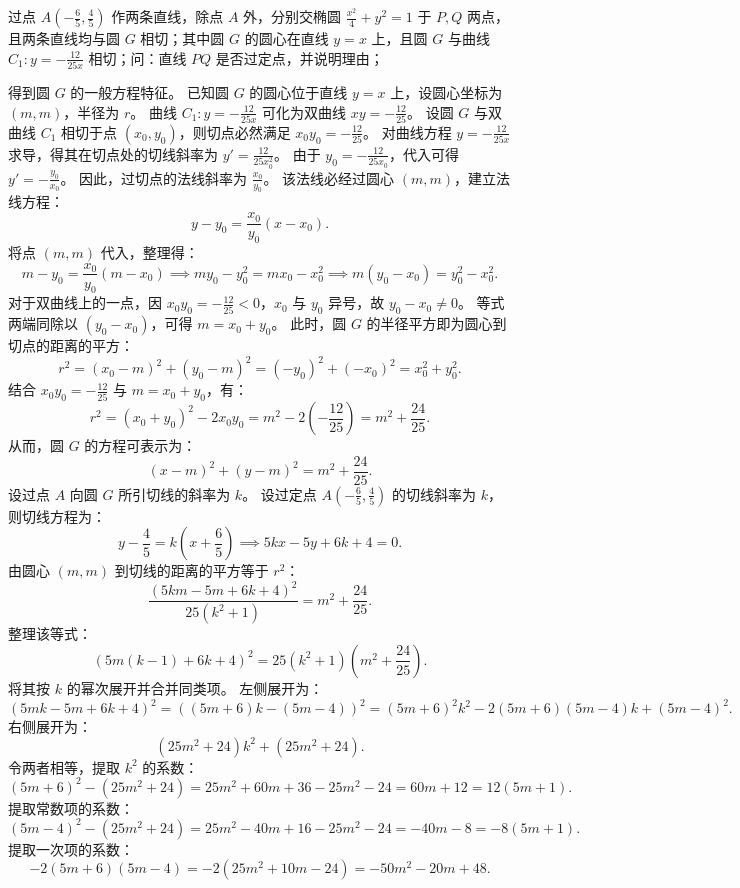 \begin{example}
过点 \(A\left(-\frac{6}{5},\frac{4}{5}\right)\) 作两条直线，除点 \(A\) 外，分别交椭圆 \(\frac{x^2}{4} + y^2 = 1\) 于 \(P,Q\) 两点，且两条直线均与圆 \(G\) 相切；其中圆 \(G\) 的圆心在直线 \(y = x\) 上，且圆 \(G\) 与曲线 \(C_1: y = -\frac{12}{25x}\) 相切；问：直线 \(PQ\) 是否过定点，并说明理由；
\end{example}
\begin{solution}
得到圆 $G$ 的一般方程特征。
已知圆 $G$ 的圆心位于直线 $y = x$ 上，设圆心坐标为 $(m, m)$，半径为 $r$。
曲线 $C_1: y = -\frac{12}{25x}$ 可化为双曲线 $xy = -\frac{12}{25}$。
设圆 $G$ 与双曲线 $C_1$ 相切于点 $(x_0, y_0)$，则切点必然满足 $x_0 y_0 = -\frac{12}{25}$。
对曲线方程 $y = -\frac{12}{25x}$ 求导，得其在切点处的切线斜率为 $y' = \frac{12}{25x_0^2}$。
由于 $y_0 = -\frac{12}{25x_0}$，代入可得 $y' = -\frac{y_0}{x_0}$。
因此，过切点的法线斜率为 $\frac{x_0}{y_0}$。
该法线必经过圆心 $(m, m)$，建立法线方程：
\[
y - y_0 = \frac{x_0}{y_0}(x - x_0).
\]
将点 $(m, m)$ 代入，整理得：
\[
m - y_0 = \frac{x_0}{y_0}(m - x_0) \implies my_0 - y_0^2 = mx_0 - x_0^2 \implies m(y_0 - x_0) = y_0^2 - x_0^2.
\]
对于双曲线上的一点，因 $x_0 y_0 = -\frac{12}{25} < 0$，$x_0$ 与 $y_0$ 异号，故 $y_0 - x_0 \neq 0$。
等式两端同除以 $(y_0 - x_0)$，可得 $m = x_0 + y_0$。
此时，圆 $G$ 的半径平方即为圆心到切点的距离的平方：
\[
r^2 = (x_0 - m)^2 + (y_0 - m)^2 = (-y_0)^2 + (-x_0)^2 = x_0^2 + y_0^2.
\]
结合 $x_0 y_0 = -\frac{12}{25}$ 与 $m = x_0 + y_0$，有：
\[
r^2 = (x_0 + y_0)^2 - 2x_0 y_0 = m^2 - 2\left(-\frac{12}{25}\right) = m^2 + \frac{24}{25}.
\]
从而，圆 $G$ 的方程可表示为：
\[
(x - m)^2 + (y - m)^2 = m^2 + \frac{24}{25}.
\]
设过点 $A$ 向圆 $G$ 所引切线的斜率为 $k$。
设过定点 $A\left(-\frac{6}{5}, \frac{4}{5}\right)$ 的切线斜率为 $k$，则切线方程为：
\[
y - \frac{4}{5} = k\left(x + \frac{6}{5}\right) \implies 5kx - 5y + 6k + 4 = 0.
\]
由圆心 $(m, m)$ 到切线的距离的平方等于 $r^2$：
\[
\frac{\left(5km - 5m + 6k + 4\right)^2}{25(k^2 + 1)} = m^2 + \frac{24}{25}.
\]
整理该等式：
\[
\left( 5m(k - 1) + 6k + 4 \right)^2 = 25(k^2 + 1)\left(m^2 + \frac{24}{25}\right).
\]
将其按 $k$ 的幂次展开并合并同类项。
左侧展开为：
\[
(5mk - 5m + 6k + 4)^2 = \left( (5m + 6)k - (5m - 4) \right)^2 = (5m + 6)^2 k^2 - 2(5m + 6)(5m - 4)k + (5m - 4)^2.
\]
右侧展开为：
\[
(25m^2 + 24)k^2 + (25m^2 + 24).
\]
令两者相等，提取 $k^2$ 的系数：
\[
(5m + 6)^2 - (25m^2 + 24) = 25m^2 + 60m + 36 - 25m^2 - 24 = 60m + 12 = 12(5m + 1).
\]
提取常数项的系数：
\[
(5m - 4)^2 - (25m^2 + 24) = 25m^2 - 40m + 16 - 25m^2 - 24 = -40m - 8 = -8(5m + 1).
\]
提取一次项的系数：
\[
-2(5m + 6)(5m - 4) = -2(25m^2 + 10m - 24) = -50m^2 - 20m + 48.
\]
\end{solution}
